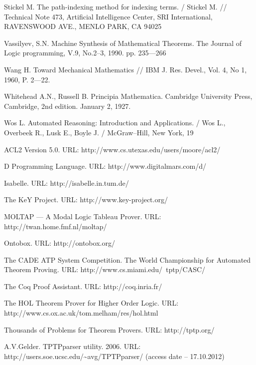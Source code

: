 \begin{thebibliography}{99}
 Stickel M. The path-indexing method for indexing terms. / Stickel M. // Technical Note 473, Artificial Intelligence Center, SRI International, RAVENSWOOD AVE., MENLO PARK, CA 94025

 Vassilyev, S.N. Machine Synthesis of Mathematical Theorems. The Journal of Logic programming, V.9, No.2--3, 1990. pp. 235---266

 Wang H. Toward Mechanical Mathematics // IBM J. Res. Devel., Vol. 4, No 1, 1960, P. 2---22.

 Whitehead A.N., Russell B. Principia Mathematica. Cambridge University Press, Cambridge, 2nd edition. January 2, 1927.

 Wos L. Automated Reasoning: Introduction and Applications. / Wos L., Overbeek R., Lusk E.,  Boyle J. / McGraw--Hill,  New York, 19


 ACL2 Version 5.0. URL: http://www.cs.utexas.edu/users/moore/acl2/

 D Programming Language. URL: http://www.digitalmars.com/d/

 Isabelle. URL: http://isabelle.in.tum.de/

 The KeY Project. URL: http://www.key-project.org/

 MOLTAP — A Modal Logic Tableau Prover. URL: http://twan.home.fmf.nl/moltap/

 Ontobox. URL: http://ontobox.org/

 The CADE ATP System Competition. The World Championship for Automated Theorem Proving. URL: http://www.cs.miami.edu/~tptp/CASC/

 The Coq Proof Assistant. URL: http://coq.inria.fr/

 The HOL Theorem Prover for Higher Order Logic. URL: http://www.cs.ox.ac.uk/tom.melham/res/hol.html

 Thousands of Problems for Theorem Provers. URL: http://tptp.org/

 A.V.Gelder. TPTPparser utility. 2006. URL: http://users.soe.ucsc.edu/\~{}avg/TPTPparser/ (access date -- 17.10.2012)








\end{thebibliography}



